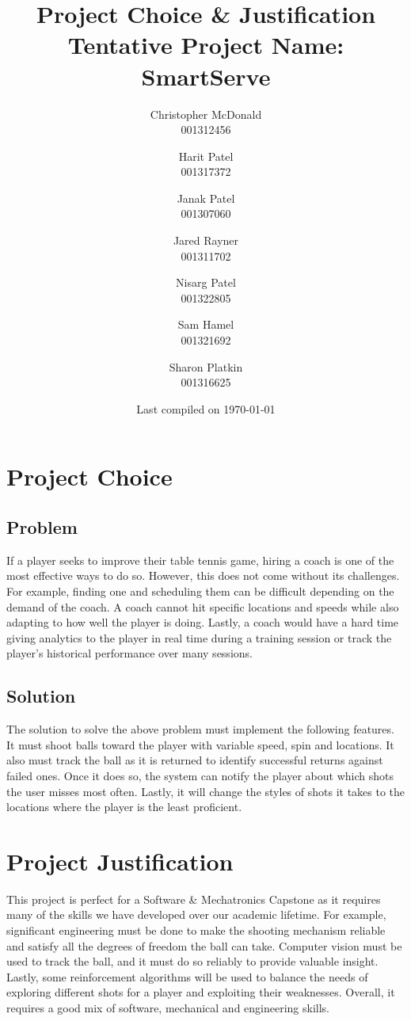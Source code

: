 \documentclass[11pt, oneside]{article}
\title{Project Choice \& Justification \\ Tentative Project Name: SmartServe}
\author{
Christopher McDonald \\ 001312456 \\ \and
Harit Patel \\ 001317372 \\ \and
Janak Patel \\ 001307060 \\ \and
Jared Rayner \\ 001311702 \\ \and
Nisarg Patel \\ 001322805 \\ \and
Sam Hamel \\ 001321692 \\ \and
Sharon Platkin \\ 001316625 \\
}
\date{Last compiled on \today}
\begin{document}
\maketitle
\section*{Project Choice}
\subsection*{Problem}
If a player seeks to improve their table tennis game, hiring a coach is one of the most effective ways to do so. However, this does not come without its challenges. For example, finding one and scheduling them can be difficult depending on the demand of the coach. A coach cannot hit specific locations and speeds while also adapting to how well the player is doing. Lastly, a coach would have a hard time giving analytics to the player in real time during a training session or track the player's historical performance over many sessions.
\subsection*{Solution}
The solution to solve the above problem must implement the following features. It must shoot balls toward the player with variable speed, spin and locations. It also must track the ball as it is returned to identify successful returns against failed ones. Once it does so, the system can notify the player about which shots the user misses most often. Lastly, it will change the styles of shots it takes to the locations where the player is the least proficient.
\section*{Project Justification}
This project is perfect for a Software \& Mechatronics Capstone as it requires many of the skills we have developed over our academic lifetime. For example, significant engineering must be done to make the shooting mechanism reliable and satisfy all the degrees of freedom the ball can take. Computer vision must be used to track the ball, and it must do so reliably to provide valuable insight. Lastly, some reinforcement algorithms will be used to balance the needs of exploring different shots for a player and exploiting their weaknesses. Overall, it requires a good mix of software, mechanical and engineering skills.
\end{document}
